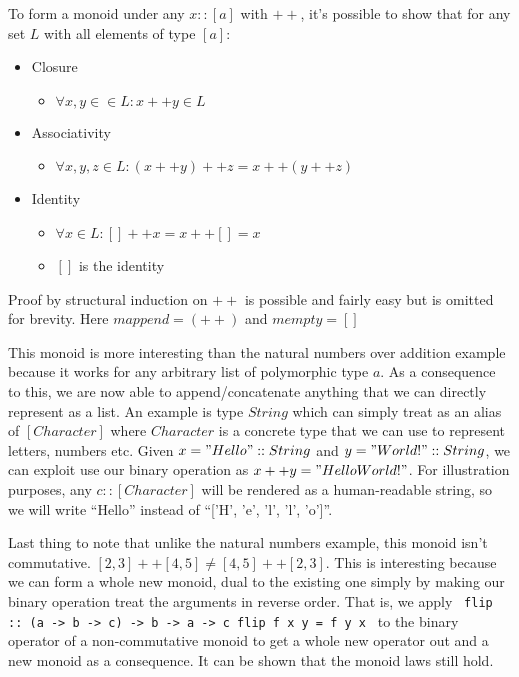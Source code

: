 \documentclass{acm_proc_article-sp}
\begin{document}
To form a monoid under any $x :: [a]$ with $++$, it's possible to show
that for any set $L$ with all elements of type $[a]$:
\begin{itemize}
\item Closure
  \begin{itemize}
  \item $\forall x,y \in \in L: x ++ y \in L$
  \end{itemize}
\item Associativity
  \begin{itemize}
  \item $\forall x,y,z \in L: (x ++ y) ++ z = x ++ (y ++ z)$
  \end{itemize}
\item Identity
  \begin{itemize}
  \item $\forall x \in L: [] ++ x = x ++ [] = x$
  \item $[]$ is the identity
  \end{itemize}
\end{itemize}
Proof by structural induction on $++$ is possible and fairly easy but
is omitted for brevity. Here $mappend = (++)$ and $mempty = []$

This monoid is more interesting than the natural numbers over addition
example because it works for any arbitrary list of polymorphic type
$a$. As a consequence to this, we are now able to append/concatenate
anything that we can directly represent as a list. An example is type
$String$ which can simply treat as an alias of $[Character]$ where $Character$
is a concrete type that we can use to represent letters, numbers
etc. Given $x = "Hello " :: String$ and $y = "World!" :: String$, we
can exploit use our binary operation as $x ++ y = "Hello World!"$. For
illustration purposes, any $c :: [Character]$ will be rendered as a
human-readable string, so we will write ``Hello'' instead of ``['H',
'e', 'l', 'l', 'o']''.

Last thing to note that unlike the natural numbers example, this
monoid isn't commutative. $[2, 3] ++ [4, 5] \neq [4, 5] ++ [2,
3]$. This is interesting because we can form a whole new monoid, dual
to the existing one simply by making our binary operation treat the
arguments in reverse order. That is, we apply
\texttt{
flip :: (a -> b -> c) -> b -> a -> c
flip f x y = f y x
}
to the binary operator of a non-commutative monoid to get a whole new
operator out and a new monoid as a consequence. It can be shown that
the monoid laws still hold.
\end{document}

